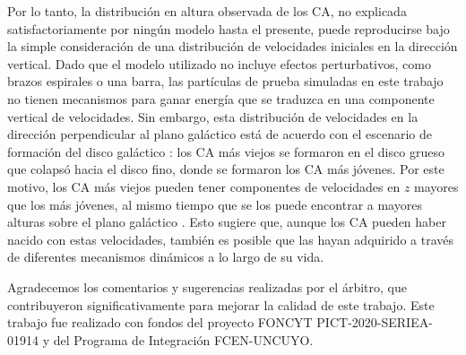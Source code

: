 \documentclass[baaa]{baaa}
\begin{document}
Por lo tanto, la distribución en altura observada de los CA, no explicada satisfactoriamente por ningún modelo hasta el presente, puede reproducirse bajo la simple consideración de una distribución de velocidades iniciales en la dirección vertical. Dado que el modelo utilizado no incluye efectos perturbativos, como brazos espirales o una barra, las partículas de prueba simuladas en este trabajo no tienen mecanismos para ganar energía que se traduzca en una componente vertical de velocidades. Sin embargo, esta distribución de velocidades en la dirección perpendicular al plano galáctico está de acuerdo con el escenario de formación del disco galáctico \citep[ver][]{burkert}: los CA más viejos se formaron en el disco grueso que colapsó hacia el disco fino, donde se formaron los CA más jóvenes. Por este motivo, los CA más viejos pueden tener componentes de velocidades en $z$ mayores que los más jóvenes, al mismo tiempo que se los puede encontrar a mayores alturas sobre el plano galáctico \citep[ver][]{Piatti}. Esto sugiere que, aunque los CA pueden haber nacido con estas velocidades, también es posible que las hayan adquirido a través de diferentes mecanismos dinámicos a lo largo de su vida.

\begin{acknowledgement}
Agradecemos los comentarios y sugerencias realizadas por el árbitro, que contribuyeron significativamente para mejorar la calidad de este trabajo. Este trabajo fue realizado con fondos del proyecto FONCYT PICT-2020-SERIEA-01914 y del Programa de Integración FCEN-UNCUYO.
\end{acknowledgement}



\small

 
\end{document}
